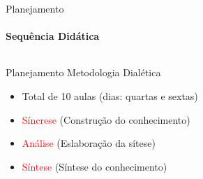 \documentclass[aspectratio=169]{beamer}
\begin{document}
\begin{frame}{Planejamento}
\framesubtitle{Sequência Didática}
\begin{columns}
	\begin{alertblock}{Planejamento}
		Metodologia Dialética \cite{VASCONCELLOS:1992}
		\begin{itemize}
			\item<1-> Total de 10 aulas (dias: quartas e sextas)
			\item<2-> \textcolor<2>{red}{Síncrese} (Construção do conhecimento)
			\item<3-> \textcolor<3>{red}{Análise} (Eslaboração da sítese)
			\item<4-> \textcolor<4>{red}{Síntese} (Síntese do conhecimento)
		\end{itemize}
	\end{alertblock}
	

	\begin{figure}[htb!]
		\centering
	\end{figure}
\end{columns}
\end{frame}
\end{document}
